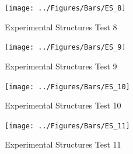 \documentclass[12pt,oneside]{book}
\begin{document}
\begin{figure}[!ht]
	\texttt{[image: ../Figures/Bars/ES\_8]}
	\caption{Experimental Structures Test 8}
	\label{fig:Experimental_Structures_Test_8}
\end{figure}

\clearpage

\begin{figure}[!ht]
	\texttt{[image: ../Figures/Bars/ES\_9]}
	\caption{Experimental Structures Test 9}
	\label{fig:Experimental_Structures_Test_9}
\end{figure}

\begin{figure}[!ht]
	\texttt{[image: ../Figures/Bars/ES\_10]}
	\caption{Experimental Structures Test 10}
	\label{fig:Experimental_Structures_Test_10}
\end{figure}

\begin{figure}[!ht]
	\texttt{[image: ../Figures/Bars/ES\_11]}
	\caption{Experimental Structures Test 11}
	\label{fig:Experimental_Structures_Test_11}
\end{figure}
\end{document}
